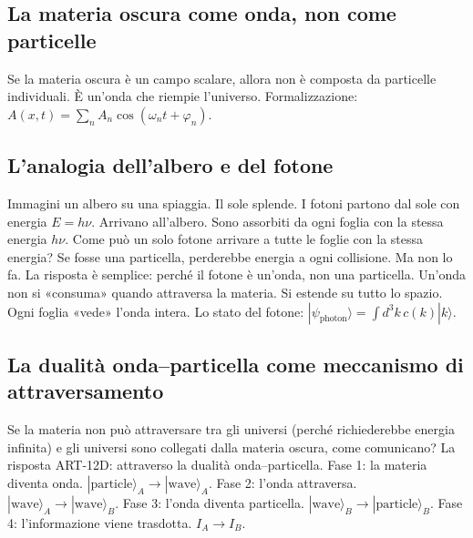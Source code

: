 \documentclass[11pt,a4paper]{article}
\begin{document}
\subsection{La materia oscura come onda, non come particelle}
Se la materia oscura è un campo scalare, allora non è composta da particelle individuali. È un'onda che riempie l'universo. Formalizzazione: $A(x,t) = \sum_n A_n \cos(\omega_n t + \varphi_n)$.

\subsection{L'analogia dell'albero e del fotone}
Immagini un albero su una spiaggia. Il sole splende. I fotoni partono dal sole con energia $E = h\nu$. Arrivano all'albero. Sono assorbiti da ogni foglia con la stessa energia $h\nu$. Come può un solo fotone arrivare a tutte le foglie con la stessa energia? Se fosse una particella, perderebbe energia a ogni collisione. Ma non lo fa. La risposta è semplice: perché il fotone è un'onda, non una particella. Un'onda non si «consuma» quando attraversa la materia. Si estende su tutto lo spazio. Ogni foglia «vede» l'onda intera. Lo stato del fotone: $|\psi_{\text{photon}}\rangle = \int d^3k \, c(k) |k\rangle$.

\subsection{La dualità onda--particella come meccanismo di attraversamento}
Se la materia non può attraversare tra gli universi (perché richiederebbe energia infinita) e gli universi sono collegati dalla materia oscura, come comunicano? La risposta ART-12D: attraverso la dualità onda--particella. Fase 1: la materia diventa onda. $|\text{particle}\rangle_A \to |\text{wave}\rangle_A$. Fase 2: l'onda attraversa. $|\text{wave}\rangle_A \to |\text{wave}\rangle_B$. Fase 3: l'onda diventa particella. $|\text{wave}\rangle_B \to |\text{particle}\rangle_B$. Fase 4: l'informazione viene trasdotta. $I_A \to I_B$.
\end{document}
